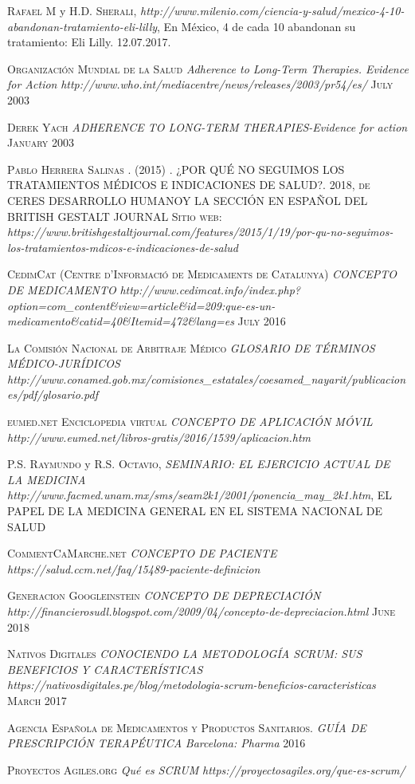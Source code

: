 \begin{thebibliography}{X}
	 \textsc{Rafael M} y \textsc{H.D. Sherali},
	\textit{http://www.milenio.com/ciencia-y-salud/mexico-4-10-abandonan-tratamiento-eli-lilly},  En México, 4 de cada 10 abandonan su tratamiento: Eli Lilly. 12.07.2017.
	
	 \textsc{Organización Mundial de la Salud} \textit{Adherence to Long-Term Therapies. Evidence for Action} \textit{http://www.who.int/mediacentre/news/releases/2003/pr54/es/} \textsc{July 2003}
	
	 \textsc{Derek Yach} \textit{ADHERENCE TO LONG-TERM THERAPIES-Evidence for action
} \textsc{January 2003}
	
	 \textsc{Pablo Herrera Salinas . (2015)} \textsc{. ¿POR QUÉ NO SEGUIMOS LOS TRATAMIENTOS MÉDICOS E INDICACIONES DE SALUD?. 2018, de CERES DESARROLLO HUMANOY LA SECCIÓN EN ESPAÑOL DEL BRITISH GESTALT JOURNAL Sitio web:} \textit{https://www.britishgestaltjournal.com/features/2015/1/19/por-qu-no-seguimos-los-tratamientos-mdicos-e-indicaciones-de-salud}
	
	 \textsc{CedimCat (Centre d'Informació de Medicaments de Catalunya)} \textit{CONCEPTO DE MEDICAMENTO} \textit{http://www.cedimcat.info/index.php?option=com\_content\&view=article\&id=209:que-es-un-medicamento\&catid=40\&Itemid=472\&lang=es} \textsc{July 2016}
	
	 \textsc{La Comisión Nacional de Arbitraje Médico} \textit{GLOSARIO DE TÉRMINOS MÉDICO-JURÍDICOS} \textit{http://www.conamed.gob.mx/comisiones\_estatales/coesamed\_nayarit/publicaciones/pdf/glosario.pdf}
	
	 \textsc{eumed.net Enciclopedia virtual} \textit{CONCEPTO DE APLICACIÓN MÓVIL} \textit{http://www.eumed.net/libros-gratis/2016/1539/aplicacion.htm}
	
	 \textsc{P.S. Raymundo} y \textsc{R.S. Octavio}, \textit{SEMINARIO: EL EJERCICIO ACTUAL DE LA MEDICINA}
	\textit{http://www.facmed.unam.mx/sms/seam2k1/2001/ponencia\_may\_2k1.htm}, EL PAPEL DE LA MEDICINA GENERAL EN EL SISTEMA NACIONAL DE SALUD
	
	 \textsc{CommentCaMarche.net} \textit{CONCEPTO DE PACIENTE} \textit{https://salud.ccm.net/faq/15489-paciente-definicion}
	
	 \textsc{Generacion Googleinstein} \textit{CONCEPTO DE DEPRECIACIÓN} \textit{http://financierosudl.blogspot.com/2009/04/concepto-de-depreciacion.html} \textsc{June 2018}
	
	 \textsc{Nativos Digitales} \textit{CONOCIENDO LA METODOLOGÍA SCRUM: SUS BENEFICIOS Y CARACTERÍSTICAS} \textit{https://nativosdigitales.pe/blog/metodologia-scrum-beneficios-caracteristicas} \textsc{March 2017}
	
	 \textsc{Agencia Española de Medicamentos y Productos Sanitarios.} \textit{GUÍA DE PRESCRIPCIÓN TERAPÉUTICA} \textit{Barcelona: Pharma} \textsc{2016}
	
	 \textsc{Proyectos Agiles.org} \textit{Qué es SCRUM} \textit{https://proyectosagiles.org/que-es-scrum/} 
\end{thebibliography}
